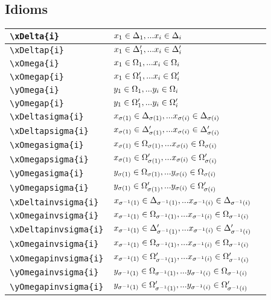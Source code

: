 \documentclass[10pt,a4paper]{article}
\begin{document}
\subsection{Idioms}
\begin{tabular}{| l | l |p{3cm}|}
\hline
\verb!\xDelta{i}! & $\xDelta{i}$&\\
 \hline
\verb!\xDeltap{i}! & $\xDeltap{i}$&\\
 \hline
\verb!\xOmega{i}! & $\xOmega{i}$&\\
 \hline
\verb!\xOmegap{i}! & $\xOmegap{i}$&\\
 \hline
\verb!\yOmega{i}! & $\yOmega{i}$&\\
 \hline
\verb!\yOmegap{i}! & $\yOmegap{i}$&\\
 \hline
\hline
\verb!\xDeltasigma{i}! & $\xDeltasigma{i}$&\\
\hline
\verb!\xDeltapsigma{i}! & $\xDeltapsigma{i}$&\\
 \hline
\verb!\xOmegasigma{i}! & $\xOmegasigma{i}$&\\
 \hline
\verb!\xOmegapsigma{i}! & $\xOmegapsigma{i}$&\\
 \hline
\verb!\yOmegasigma{i}! & $\yOmegasigma{i}$&\\
 \hline
\verb!\yOmegapsigma{i}! & $\yOmegapsigma{i}$&\\
 \hline
\hline
\verb!\xDeltainvsigma{i}! & $\xDeltainvsigma{i}$&\\
 \hline
\verb!\xOmegainvsigma{i}! & $\xOmegainvsigma{i}$&\\
\hline
\verb!\xDeltapinvsigma{i}! & $\xDeltapinvsigma{i}$&\\
 \hline
\verb!\xOmegainvsigma{i}! & $\xOmegainvsigma{i}$&\\
 \hline
\verb!\xOmegapinvsigma{i}! & $\xOmegapinvsigma{i}$&\\
 \hline
\verb!\yOmegainvsigma{i}! & $\yOmegainvsigma{i}$&\\
 \hline
\verb!\yOmegapinvsigma{i}! & $\yOmegapinvsigma{i}$&\\
 \hline
\end{tabular} \\
\end{document}
